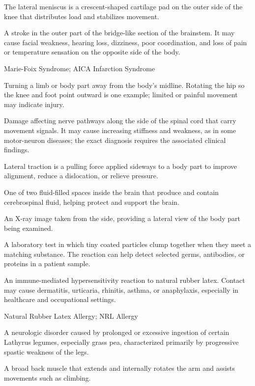  The lateral meniscus is a crescent-shaped cartilage pad on the outer side of the knee that distributes load and stabilizes movement.

 A stroke in the outer part of the bridge-like section of the brainstem. It may cause facial weakness, hearing loss, dizziness, poor coordination, and loss of pain or temperature sensation on the opposite side of the body.

\synonyms
Marie-Foix Syndrome; AICA Infarction Syndrome

 Turning a limb or body part away from the body’s midline. Rotating the hip so the knee and foot point outward is one example; limited or painful movement may indicate injury.

 Damage affecting nerve pathways along the side of the spinal cord that carry movement signals. It may cause increasing stiffness and weakness, as in some motor-neuron diseases; the exact diagnosis requires the associated clinical findings.

 Lateral traction is a pulling force applied sideways to a body part to improve alignment, reduce a dislocation, or relieve pressure.

 One of two fluid-filled spaces inside the brain that produce and contain cerebrospinal fluid, helping protect and support the brain.

 An X-ray image taken from the side, providing a lateral view of the body part being examined.

 A laboratory test in which tiny coated particles clump together when they meet a matching substance. The reaction can help detect selected germs, antibodies, or proteins in a patient sample.

 An immune-mediated hypersensitivity reaction to natural rubber latex. Contact may cause
dermatitis, urticaria, rhinitis, asthma, or anaphylaxis, especially in healthcare and
occupational settings.

\synonyms
Natural Rubber Latex Allergy; NRL Allergy

 A neurologic disorder caused by prolonged or excessive ingestion of certain Lathyrus legumes, especially grass pea, characterized primarily by progressive spastic weakness of the legs.

 A broad back muscle that extends and internally rotates the arm and assists movements such as climbing.

